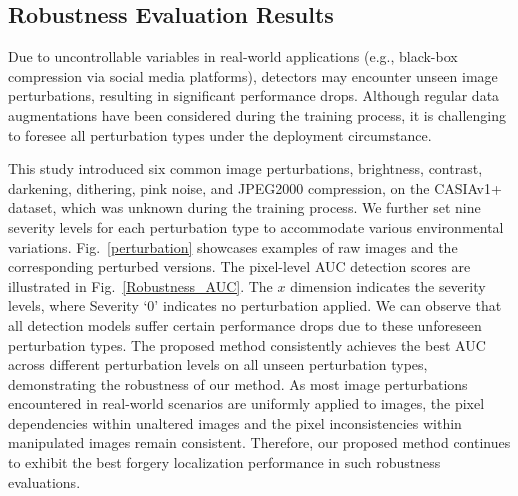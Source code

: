 \documentclass[10pt,journal,compsoc]{IEEEtran}
\begin{document}
\subsection{Robustness Evaluation Results} 
Due to uncontrollable variables in real-world applications (e.g., black-box compression via social media platforms), detectors may encounter unseen image perturbations, resulting in significant performance drops. Although regular data augmentations have been considered during the training process, it is challenging to foresee all perturbation types under the deployment circumstance.

This study introduced six common image perturbations, brightness, contrast, darkening, dithering, pink noise, and JPEG2000 compression, on the CASIAv1+ \cite{dong2013casia} dataset, which was unknown during the training process. We further set nine severity levels for each perturbation type to accommodate various environmental variations.
Fig.~\ref{perturbation} showcases examples of raw images and the corresponding perturbed versions. The pixel-level AUC detection scores are illustrated in Fig.~\ref{Robustness_AUC}. The $x$ dimension indicates the severity levels, where Severity `0' indicates no perturbation applied. We can observe that all detection models suffer certain performance drops due to these unforeseen perturbation types. The proposed method consistently achieves the best AUC across different perturbation levels on all unseen perturbation types, demonstrating the robustness of our method. As most image perturbations encountered in real-world scenarios are uniformly applied to images, the pixel dependencies within unaltered images and the pixel inconsistencies within manipulated images remain consistent. Therefore, our proposed method continues to exhibit the best forgery localization performance in such robustness evaluations.  





\end{document}
